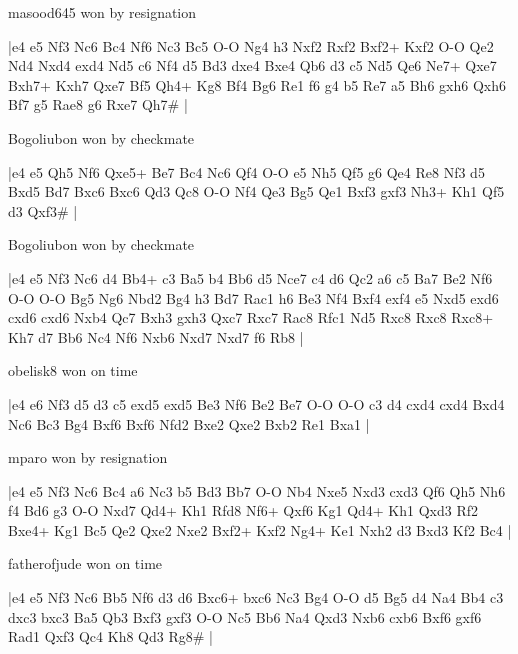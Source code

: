 \showboard

masood645 won by resignation

\makegametitle
|e4 e5 Nf3 Nc6 Bc4 Nf6 Nc3 Bc5 O-O Ng4 h3 Nxf2 Rxf2 Bxf2+ Kxf2 O-O Qe2 Nd4 Nxd4 exd4 Nd5 c6 Nf4 d5 Bd3 dxe4 Bxe4 Qb6 d3 c5 Nd5 Qe6 Ne7+ Qxe7 Bxh7+ Kxh7 Qxe7 Bf5 Qh4+ Kg8 Bf4 Bg6 Re1 f6 g4 b5 Re7 a5 Bh6 gxh6 Qxh6 Bf7 g5 Rae8 g6 Rxe7 Qh7\#  |

\showboard

Bogoliubon won by checkmate

\makegametitle
|e4 e5 Qh5 Nf6 Qxe5+ Be7 Bc4 Nc6 Qf4 O-O e5 Nh5 Qf5 g6 Qe4 Re8 Nf3 d5 Bxd5 Bd7 Bxc6 Bxc6 Qd3 Qc8 O-O Nf4 Qe3 Bg5 Qe1 Bxf3 gxf3 Nh3+ Kh1 Qf5 d3 Qxf3\#  |

\showboard

Bogoliubon won by checkmate

\makegametitle
|e4 e5 Nf3 Nc6 d4 Bb4+ c3 Ba5 b4 Bb6 d5 Nce7 c4 d6 Qc2 a6 c5 Ba7 Be2 Nf6 O-O O-O Bg5 Ng6 Nbd2 Bg4 h3 Bd7 Rac1 h6 Be3 Nf4 Bxf4 exf4 e5 Nxd5 exd6 cxd6 cxd6 Nxb4 Qc7 Bxh3 gxh3 Qxc7 Rxc7 Rac8 Rfc1 Nd5 Rxc8 Rxc8 Rxc8+ Kh7 d7 Bb6 Nc4 Nf6 Nxb6 Nxd7 Nxd7 f6 Rb8  |

\showboard

obelisk8 won on time

\makegametitle
|e4 e6 Nf3 d5 d3 c5 exd5 exd5 Be3 Nf6 Be2 Be7 O-O O-O c3 d4 cxd4 cxd4 Bxd4 Nc6 Bc3 Bg4 Bxf6 Bxf6 Nfd2 Bxe2 Qxe2 Bxb2 Re1 Bxa1  |

\showboard

mparo won by resignation

\makegametitle
|e4 e5 Nf3 Nc6 Bc4 a6 Nc3 b5 Bd3 Bb7 O-O Nb4 Nxe5 Nxd3 cxd3 Qf6 Qh5 Nh6 f4 Bd6 g3 O-O Nxd7 Qd4+ Kh1 Rfd8 Nf6+ Qxf6 Kg1 Qd4+ Kh1 Qxd3 Rf2 Bxe4+ Kg1 Bc5 Qe2 Qxe2 Nxe2 Bxf2+ Kxf2 Ng4+ Ke1 Nxh2 d3 Bxd3 Kf2 Bc4  |

\showboard

fatherofjude won on time

\makegametitle
|e4 e5 Nf3 Nc6 Bb5 Nf6 d3 d6 Bxc6+ bxc6 Nc3 Bg4 O-O d5 Bg5 d4 Na4 Bb4 c3 dxc3 bxc3 Ba5 Qb3 Bxf3 gxf3 O-O Nc5 Bb6 Na4 Qxd3 Nxb6 cxb6 Bxf6 gxf6 Rad1 Qxf3 Qc4 Kh8 Qd3 Rg8\#  |

